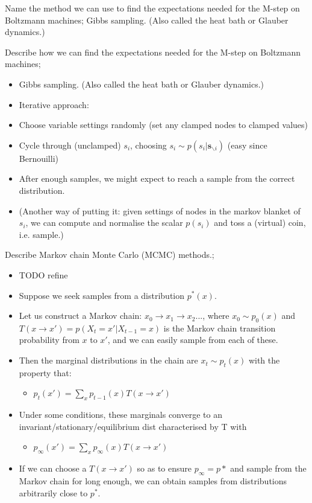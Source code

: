 \documentclass{article}
\begin{document}
Name the method we can use to find the expectations needed for the M-step on Boltzmann machines; Gibbs sampling. (Also called the heat bath or Glauber dynamics.)

Describe how we can find the expectations needed for the M-step on Boltzmann machines; \begin{itemize}
    \item Gibbs sampling. (Also called the heat bath or Glauber dynamics.)
    \item Iterative approach:
    \item Choose variable settings randomly (set any clamped nodes to clamped values)
    \item Cycle through (unclamped) $s_i$, choosing $s_i \sim p(s_i|\mathbf{s}_{\backslash i})$ (easy since Bernouilli)
    \item After enough samples, we might expect to reach a sample from the correct distribution.
    \item (Another way of putting it: given settings of nodes in the markov blanket of $s_i$, we can compute and normalise the scalar $p(s_i)$ and toss a (virtual) coin, i.e. sample.)
\end{itemize}

Describe Markov chain Monte Carlo (MCMC) methods.; \begin{itemize}
    \item TODO refine
    \item Suppose we seek samples from a distribution $p^*(x)$.
    \item Let us construct a Markov chain: $x_0 \rightarrow x_1 \rightarrow x_2 ... $, where $x_0 \sim p_0(x)$ and $T(x\rightarrow x') = p(X_t = x' | X_{t-1} = x)$ is the Markov chain transition probability from $x$ to $x'$, and we can easily sample from each of these.
    \item Then the marginal distributions in the chain are $x_t \sim p_t(x)$ with the property that: \begin{itemize}
        \item $p_t(x') = \sum_x p_{t-1}(x) T (x\rightarrow x')$
    \end{itemize}
    \item Under some conditions, these marginals converge to an invariant/stationary/equilibrium dist characterised by T with \begin{itemize}
        \item $p_{\infty}(x') = \sum_x p_{\infty}(x)T(x\rightarrow x')$
    \end{itemize}
    \item If we can choose a $T(x\rightarrow x')$ so as to ensure $p_{\infty} = p*$ and sample from the Markov chain for long enough, we can obtain samples from distributions arbitrarily close to $p^*$.
\end{itemize}
\end{document}
